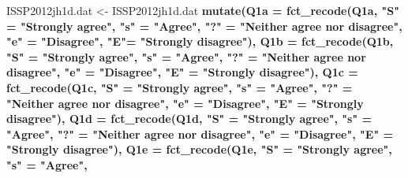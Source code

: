 \documentclass[
  finnish,
]{book}
\newenvironment{Shaded}{\begin{snugshade}}{\end{snugshade}}
\newcommand{\DataTypeTok}[1]{\textcolor[rgb]{0.13,0.29,0.53}{#1}}
\newcommand{\KeywordTok}[1]{\textcolor[rgb]{0.13,0.29,0.53}{\textbf{#1}}}
\newcommand{\NormalTok}[1]{#1}
\newcommand{\OperatorTok}[1]{\textcolor[rgb]{0.81,0.36,0.00}{\textbf{#1}}}
\newcommand{\StringTok}[1]{\textcolor[rgb]{0.31,0.60,0.02}{#1}}
\begin{document}
\begin{Shaded}
\begin{Highlighting}[]
{{{{{{{{{{{{{{{{{{{{{{{{{{{{{{{{{{{{{{{{{{{{{{{{{{{{{{{{{{{{{{{{{{{{{{{{{{{{{{{{{{{{{{{{{{{{{{{{{{{{{{\NormalTok{ISSP2012jh1d.dat <-}\StringTok{ }\NormalTok{ISSP2012jh1d.dat }\OperatorTok{%
\StringTok{    }\KeywordTok{mutate}\NormalTok{(}\DataTypeTok{Q1a =} \KeywordTok{fct_recode}\NormalTok{(Q1a,}
                        \StringTok{"S"}\NormalTok{ =}\StringTok{ "Strongly agree"}\NormalTok{,}
                        \StringTok{"s"}\NormalTok{ =}\StringTok{ "Agree"}\NormalTok{,}
                        \StringTok{"?"}\NormalTok{ =}\StringTok{ "Neither agree nor disagree"}\NormalTok{,}
                        \StringTok{"e"}\NormalTok{ =}\StringTok{ "Disagree"}\NormalTok{,}
                        \StringTok{"E"}\NormalTok{=}\StringTok{ "Strongly disagree"}\NormalTok{),}
            \DataTypeTok{Q1b =} \KeywordTok{fct_recode}\NormalTok{(Q1b,}
                      \StringTok{"S"}\NormalTok{ =}\StringTok{ "Strongly agree"}\NormalTok{,}
                      \StringTok{"s"}\NormalTok{ =}\StringTok{ "Agree"}\NormalTok{,}
                      \StringTok{"?"}\NormalTok{ =}\StringTok{ "Neither agree nor disagree"}\NormalTok{,}
                      \StringTok{"e"}\NormalTok{ =}\StringTok{ "Disagree"}\NormalTok{,}
                      \StringTok{"E"}\NormalTok{ =}\StringTok{ "Strongly disagree"}\NormalTok{),}
           \DataTypeTok{Q1c =} \KeywordTok{fct_recode}\NormalTok{(Q1c,}
                           \StringTok{"S"}\NormalTok{ =}\StringTok{ "Strongly agree"}\NormalTok{,}
                           \StringTok{"s"}\NormalTok{ =}\StringTok{ "Agree"}\NormalTok{,}
                           \StringTok{"?"}\NormalTok{ =}\StringTok{ "Neither agree nor disagree"}\NormalTok{,}
                           \StringTok{"e"}\NormalTok{ =}\StringTok{ "Disagree"}\NormalTok{,}
                           \StringTok{"E"}\NormalTok{ =}\StringTok{ "Strongly disagree"}\NormalTok{),}
           \DataTypeTok{Q1d =} \KeywordTok{fct_recode}\NormalTok{(Q1d,}
                           \StringTok{"S"}\NormalTok{ =}\StringTok{ "Strongly agree"}\NormalTok{,}
                           \StringTok{"s"}\NormalTok{ =}\StringTok{ "Agree"}\NormalTok{,}
                           \StringTok{"?"}\NormalTok{ =}\StringTok{ "Neither agree nor disagree"}\NormalTok{,}
                           \StringTok{"e"}\NormalTok{ =}\StringTok{ "Disagree"}\NormalTok{,}
                           \StringTok{"E"}\NormalTok{ =}\StringTok{ "Strongly disagree"}\NormalTok{),}
           \DataTypeTok{Q1e =} \KeywordTok{fct_recode}\NormalTok{(Q1e,}
                           \StringTok{"S"}\NormalTok{ =}\StringTok{ "Strongly agree"}\NormalTok{,}
                           \StringTok{"s"}\NormalTok{ =}\StringTok{ "Agree"}\NormalTok{,}
}}}}}}}}}}}}}}}}}}}}}}}}}}}}}}}}}}}}}}}}}}}}}}}}}}}}}}}}}}}}}}}}}}}}}}}}}}}}}}}}}}}}}}}}}}}}}}}}}}}}}}}
\end{Highlighting}
\end{Shaded}
\end{document}
